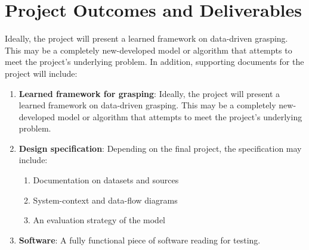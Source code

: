 \documentclass{article}
\begin{document}
\section{Project Outcomes and Deliverables}
Ideally, the project will present a learned framework on data-driven grasping. This may be a completely new-developed model or algorithm that attempts to meet the project's underlying problem. In addition, supporting documents for the project will include:
\begin{enumerate}
    \item \textbf{Learned framework for grasping}: Ideally, the project will present a learned framework on data-driven grasping. This may be a completely new-developed model or algorithm that attempts to meet the project's underlying problem.
    \item \textbf{Design specification}: Depending on the final project, the specification may include:
    \begin{enumerate}
        \item Documentation on datasets and sources
        \item System-context and data-flow diagrams
        \item An evaluation strategy of the model
    \end{enumerate}
    \item \textbf{Software}: A fully functional piece of software reading for testing.
\end{enumerate}
\end{document}
